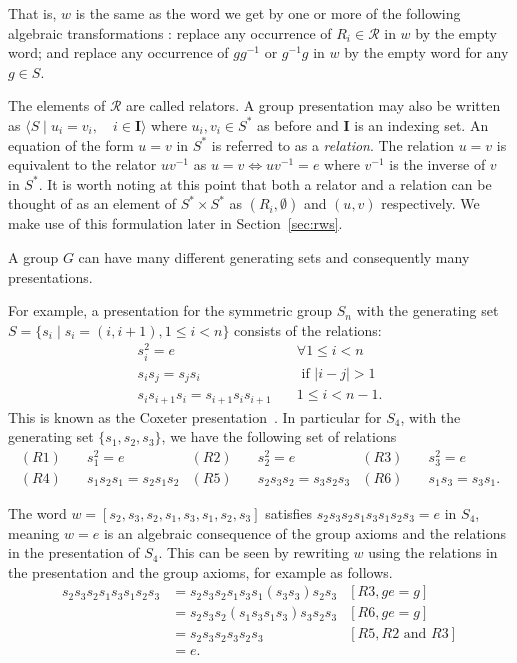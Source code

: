 \documentclass[12pt,a4paper]{amsart}
\newcommand{\id}{e}
\numberwithin{equation}{section}
\begin{document}
That is, $w$ is the same as the word we get by one or more of the following algebraic transformations : replace any occurrence of $R_i \in \mathcal{R}$ in $w$ by the empty word; and replace any occurrence of $gg^{-1}$ or $g^{-1}g$ in $w$ by the empty word for any $g \in S$.

The elements of $\mathcal{R}$ are called relators. A group presentation may also be written as
$\langle S \mid u_i = v_i, \quad i \in \mathbf{I}  \rangle$ where $u_i, v_i \in S^*$ as before and $\mathbf{I}$ is an indexing set. An equation of the form $u = v$ in $S^*$ is referred to as a \emph{relation}. The relation $u = v$ is equivalent to the relator $u v^{-1}$ as $u = v \iff u v^{-1} = \id$ where $v^{-1}$ is the inverse of $v$ in $S^*$.  It is worth noting at this point that both a relator and a relation can be thought of as an element of $S^* \times S^*$ as $(R_i, \emptyset)$ and $(u, v)$ respectively. We make use of this formulation later in Section~\ref{sec:rws}.

A group $G$ can have many different generating sets and consequently many presentations.  


For example, a presentation for the symmetric group $S_n$ with the generating set $S=\{s_i \mid s_i = (i, i+1), 1 \leq i < n\}$ consists of the relations:
\begin{align*}
s_i^2 = \id & \quad \forall 1 \leq i < n \\
s_i s_j = s_j s_i & \quad \mbox{ if } |i-j| > 1 \\
s_i s_{i+1} s_i = s_{i+1} s_i s_{i+1} & \quad 1 \leq i < n-1.
\end{align*}
This is known as the Coxeter presentation~\citep{humphreys1992reflection}. 
In particular for $S_4$, with the generating set $\{s_1, s_2, s_3\}$, we have the following set of relations
\begin{align*}
(R1) & \quad s_1^2 = \id & (R2) & \quad s_2^2 = \id & (R3) & \quad s_3^2 = \id\\
(R4) & \quad s_1 s_2 s_1 = s_2 s_1 s_2  & (R5) & \quad s_2 s_3 s_2 = s_3 s_2 s_3 
 & (R6) & \quad s_1 s_3 = s_3 s_1. 
\end{align*}

The word $w = [s_2, s_3, s_2, s_1, s_3, s_1, s_2, s_3]$ satisfies  
$s_2 s_3 s_2 s_1 s_3 s_1 s_2 s_3 
=
\id$ in $S_4$, meaning $w 
=
\id$ is an algebraic consequence of the group axioms and the relations in the presentation of $S_4$. This can be seen by rewriting $w$ using the relations in the presentation and the group axioms, for example as follows.
% 
\begin{align*}
s_2 s_3 s_2 s_1 s_3 s_1 s_2 s_3 &= s_2 s_3 s_2 s_1 s_3 s_1 (s_3 s_3) s_2 s_3 & [R3, g\id=g] \\
&= s_2 s_3 s_2 (s_1 s_3 s_1 s_3) s_3 s_2 s_3 & [R6, g\id=g]\\
&= s_2 s_3 s_2 s_3 s_2 s_3 & [R5, R2 \text{ and }R3]\\
&= \id.
\end{align*}
\end{document}
